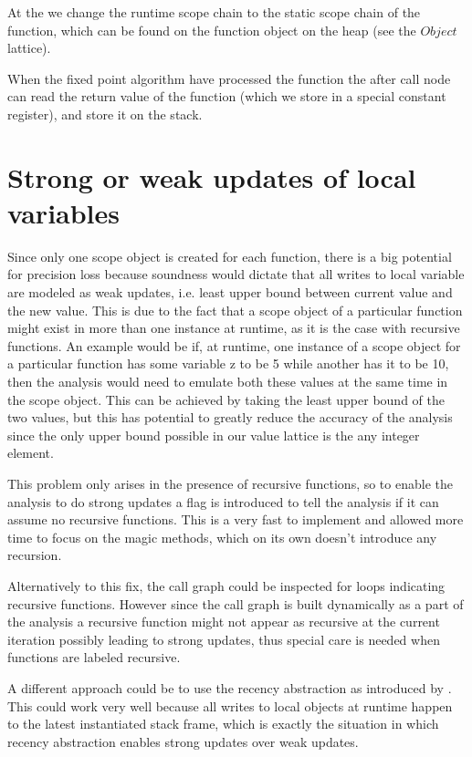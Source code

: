 At the  we change the runtime scope chain to the static scope chain of the function, which can be found on the function object on the heap (see the $Object$ lattice).

When the fixed point algorithm have processed the function the after call node can read the return value of the function (which we store in a special constant register), and store it on the stack.

\section{Strong or weak updates of local variables}
Since only one scope object is created for each function, there is a big potential for precision loss because soundness would dictate that all writes to local variable are modeled as weak updates, i.e. least upper bound between current value and the new value. This is due to the fact that a scope object of a particular function might exist in more than one instance at runtime, as it is the case with recursive functions. An example would be if, at runtime, one instance of a scope object for a particular function has some variable z to be 5 while another has it to be 10, then the analysis would need to emulate both these values at the same time in the scope object. This can be achieved by taking the least upper bound of the two values, but this has potential to greatly reduce the accuracy of the analysis since the only upper bound possible in our value lattice is the any integer element.

This problem only arises in the presence of recursive functions, so to enable the analysis to do strong updates a flag is introduced to tell the analysis if it can assume no recursive functions. This is a very fast to implement and allowed more time to focus on the magic methods, which on its own doesn't introduce any recursion.

Alternatively to this fix, the call graph could be inspected for loops indicating recursive functions. However since the call graph is built dynamically as a part of the analysis a recursive function might not appear as recursive at the current iteration possibly leading to strong updates, thus special care is needed when functions are labeled recursive.

A different approach could be to use the recency abstraction as introduced by \cite{recency}. This could work very well because all writes to local objects at runtime happen to the latest  instantiated stack frame, which is exactly the situation in which recency abstraction enables strong updates over weak updates.

